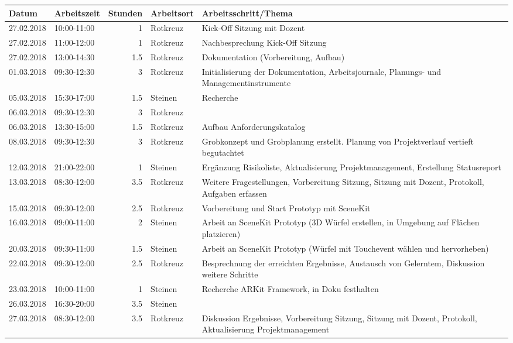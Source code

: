 \begin{longtable}{llrlp{7cm}}
	\hline
	Datum      & Arbeitszeit & Stunden & Arbeitsort & Arbeitsschritt/Thema \\
	\hline
	27.02.2018 & 10:00-11:00 & 1      & Rotkreuz & Kick-Off Sitzung mit Dozent \\
	27.02.2018 & 11:00-12:00 & 1      & Rotkreuz & Nachbesprechung Kick-Off Sitzung \\
	27.02.2018 & 13:00-14:30 & 1.5    & Rotkreuz & Dokumentation (Vorbereitung, Aufbau) \\
	01.03.2018 & 09:30-12:30 & 3    & Rotkreuz & Initialisierung der Dokumentation, Arbeitsjournale, Planungs- und Managementinstrumente \\
	05.03.2018 & 15:30-17:00 & 1.5    & Steinen & Recherche \\
	06.03.2018 & 09:30-12:30 & 3      & Rotkreuz \\
	06.03.2018 & 13:30-15:00 & 1.5    & Rotkreuz & Aufbau Anforderungskatalog \\
	08.03.2018 & 09:30-12:30 & 3      & Rotkreuz & Grobkonzept und Grobplanung erstellt. Planung von Projektverlauf vertieft begutachtet \\
	12.03.2018 & 21:00-22:00 & 1      & Steinen & Ergänzung Risikoliste, Aktualisierung Projektmanagement, Erstellung Statusreport \\
	13.03.2018 & 08:30-12:00 & 3.5    & Rotkreuz & Weitere Fragestellungen, Vorbereitung Sitzung, Sitzung mit Dozent, Protokoll, Aufgaben erfassen \\
	15.03.2018 & 09:30-12:00 & 2.5    & Rotkreuz & Vorbereitung und Start Prototyp mit SceneKit \\
	16.03.2018 & 09:00-11:00 & 2      & Steinen & Arbeit an SceneKit Prototyp (3D Würfel erstellen, in Umgebung auf Flächen platzieren) \\
	20.03.2018 & 09:30-11:00 & 1.5    & Steinen & Arbeit an SceneKit Prototyp (Würfel mit Touchevent wählen und hervorheben) \\
	22.03.2018 & 09:30-12:00 & 2.5    & Rotkreuz & Besprechnung der erreichten Ergebnisse, Austausch von Gelerntem, Diskussion weitere Schritte \\
	23.03.2018 & 10:00-11:00 & 1      & Steinen & Recherche ARKit Framework, in Doku festhalten \\
	26.03.2018 & 16:30-20:00 & 3.5    & Steinen \\
	27.03.2018 & 08:30-12:00 & 3.5    & Rotkreuz & Diskussion Ergebnisse, Vorbereitung Sitzung, Sitzung mit Dozent, Protokoll, Aktualisierung Projektmanagement \\

\end{longtable}
